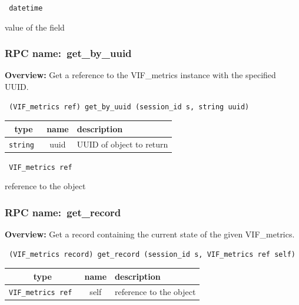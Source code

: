 \vspace{0.3cm}

{\tt 
datetime
}


value of the field
\vspace{0.3cm}
\vspace{0.3cm}
\vspace{0.3cm}
\subsubsection{RPC name:~get\_by\_uuid}

{\bf Overview:} 
Get a reference to the VIF\_metrics instance with the specified UUID.

\begin{verbatim} (VIF_metrics ref) get_by_uuid (session_id s, string uuid)\end{verbatim}



 
\vspace{0.3cm}
\begin{tabular}{|c|c|p{7cm}|}
 \hline
{\bf type} & {\bf name} & {\bf description} \\ \hline
{\tt string } & uuid & UUID of object to return \\ \hline 

\end{tabular}

\vspace{0.3cm}

{\tt 
VIF\_metrics ref
}


reference to the object
\vspace{0.3cm}
\vspace{0.3cm}
\vspace{0.3cm}
\subsubsection{RPC name:~get\_record}

{\bf Overview:} 
Get a record containing the current state of the given VIF\_metrics.

\begin{verbatim} (VIF_metrics record) get_record (session_id s, VIF_metrics ref self)\end{verbatim}



 
\vspace{0.3cm}
\begin{tabular}{|c|c|p{7cm}|}
 \hline
{\bf type} & {\bf name} & {\bf description} \\ \hline
{\tt VIF\_metrics ref } & self & reference to the object \\ \hline 

\end{tabular}

